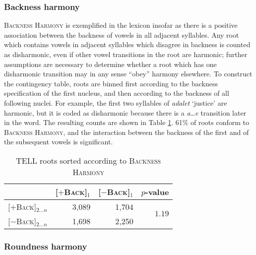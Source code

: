 \subsubsection{Backness harmony}

\textsc{Backness Harmony} is exemplified in the lexicon insofar as there is a positive association between the backness of vowels in all adjacent syllables.
Any root which contains vowels in adjacent syllables which disagree in backness is counted as disharmonic, even if other vowel transitions in the root are harmonic; further assumptions are necessary to determine whether a root which has one disharmonic transition may in any sense ``obey'' harmony elsewhere.
To construct the contingency table, roots are binned first according to the backness specification of the first nucleus, and then according to the backness of all following nuclei.
For example, the first two syllables of \emph{adalet} `justice' are harmonic, but it is coded as disharmonic because there is a \emph{a\ldots{}e} transition later in the word.
The resulting counts are shown in Table \ref{bhs}. 
61\% of roots conform to \textsc{Backness Harmony}, and the interaction between the backness of the first and of the subsequent vowels is significant.

\begin{table}[t]
\centering
\begin{tabular}{lrrr}
\toprule
                             & [$+$\textsc{Back}]$_1$ & [$-$\textsc{Back}]$_1$ & $p$-value                     \\
\midrule
\buf{}[$+$\textsc{Back}]$_{2\ldots{}n}$ & 3,089                     & 1,704              & \multirow{2}{*}{$1.19$\e{-89}} \\
\buf{}[$-$\textsc{Back}]$_{2\ldots{}n}$ & 1,698                     & 2,250                                               \\
\bottomrule
\end{tabular}
\caption{TELL roots sorted according to \textsc{Backness Harmony}}
\label{bhs}
\end{table}

\subsubsection{Roundness harmony}

